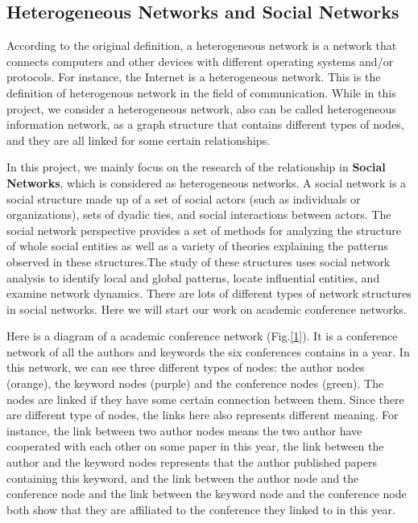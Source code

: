 \documentclass{acmtog} %
\begin{document}
\subsection{Heterogeneous Networks and Social Networks}
According to the original definition, a heterogeneous network is a network that connects computers and other devices with different operating systems and/or protocols\cite{wikipedia}. For instance, the Internet is a heterogeneous network. This is the definition of heterogenous network in the field of communication. While in this project, we consider a heterogeneous network, also can be called heterogeneous information network, as a graph structure that contains different types of nodes, and they are all linked for some certain relationships.
\par In this project, we mainly focus on the research of the relationship in \textbf{Social Networks}, which is considered as heterogeneous networks. A social network is a social structure made up of a set of social actors (such as individuals or organizations), sets of dyadic ties, and social interactions between actors\cite{wikipediasn}. The social network perspective provides a set of methods for analyzing the structure of whole social entities as well as a variety of theories explaining the patterns observed in these structures\cite{WS}.The study of these structures uses social network analysis to identify local and global patterns, locate influential entities, and examine network dynamics. There are lots of different types of network structures in social networks. Here we will start our work on academic conference networks.
\par Here is a diagram of a academic conference network (Fig.\ref{1}). It is a conference network of all the authors and keywords the six conferences contains in a year. In this network, we can see three different types of nodes: the author nodes (orange), the keyword nodes (purple) and the conference nodes (green). The nodes are linked if they have some certain connection between them. Since there are different type of nodes, the links here also represents different meaning. For instance, the link between two author nodes means the two author have cooperated with each other on some paper in this year, the link between the author and the keyword nodes represents that the author published papers containing this keyword, and the link between the author node and the conference node and the link between the keyword node and the conference node both show that they are affiliated to the conference they linked to in this year.
\end{document}
